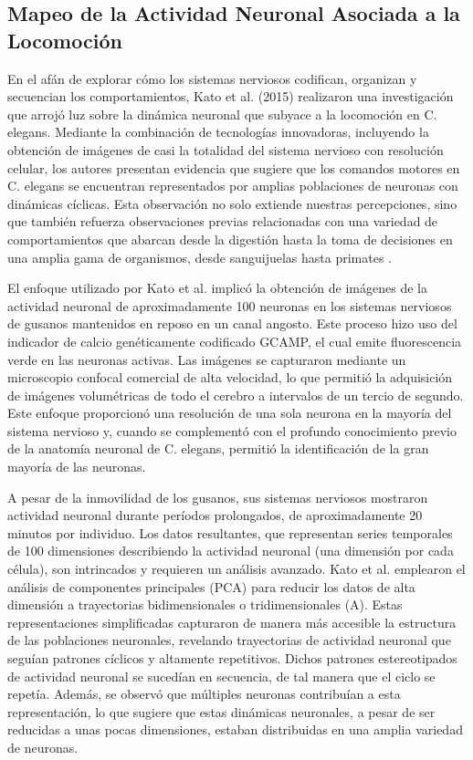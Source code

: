 \subsection{Mapeo de la Actividad Neuronal Asociada a la Locomoción}\label{sec:kato}


En el afán de explorar cómo los sistemas nerviosos codifican, organizan y secuencian los comportamientos, Kato et al. (2015) realizaron una investigación que arrojó luz sobre la dinámica neuronal que subyace a la locomoción en C. elegans. Mediante la combinación de tecnologías innovadoras, incluyendo la obtención de imágenes de casi la totalidad del sistema nervioso con resolución celular, los autores presentan evidencia que sugiere que los comandos motores en C. elegans se encuentran representados por amplias poblaciones de neuronas con dinámicas cíclicas. Esta observación no solo extiende nuestras percepciones, sino que también refuerza observaciones previas relacionadas con una variedad de comportamientos que abarcan desde la digestión hasta la toma de decisiones en una amplia gama de organismos, desde sanguijuelas hasta primates \cite{branson_imaging_2015}.

El enfoque utilizado por Kato et al. implicó la obtención de imágenes de la actividad neuronal de aproximadamente 100 neuronas en los sistemas nerviosos de gusanos mantenidos en reposo en un canal angosto. Este proceso hizo uso del indicador de calcio genéticamente codificado GCAMP, el cual emite fluorescencia verde en las neuronas activas. Las imágenes se capturaron mediante un microscopio confocal comercial de alta velocidad, lo que permitió la adquisición de imágenes volumétricas de todo el cerebro a intervalos de un tercio de segundo. Este enfoque proporcionó una resolución de una sola neurona en la mayoría del sistema nervioso y, cuando se complementó con el profundo conocimiento previo de la anatomía neuronal de C. elegans, permitió la identificación de la gran mayoría de las neuronas.

A pesar de la inmovilidad de los gusanos, sus sistemas nerviosos mostraron actividad neuronal durante períodos prolongados, de aproximadamente 20 minutos por individuo. Los datos resultantes, que representan series temporales de 100 dimensiones describiendo la actividad neuronal (una dimensión por cada célula), son intrincados y requieren un análisis avanzado. Kato et al. emplearon el análisis de componentes principales (PCA) para reducir los datos de alta dimensión a trayectorias bidimensionales o tridimensionales (A). Estas representaciones simplificadas capturaron de manera más accesible la estructura de las poblaciones neuronales, revelando trayectorias de actividad neuronal que seguían patrones cíclicos y altamente repetitivos. Dichos patrones estereotipados de actividad neuronal se sucedían en secuencia, de tal manera que el ciclo se repetía. Además, se observó que múltiples neuronas contribuían a esta representación, lo que sugiere que estas dinámicas neuronales, a pesar de ser reducidas a unas pocas dimensiones, estaban distribuidas en una amplia variedad de neuronas.



